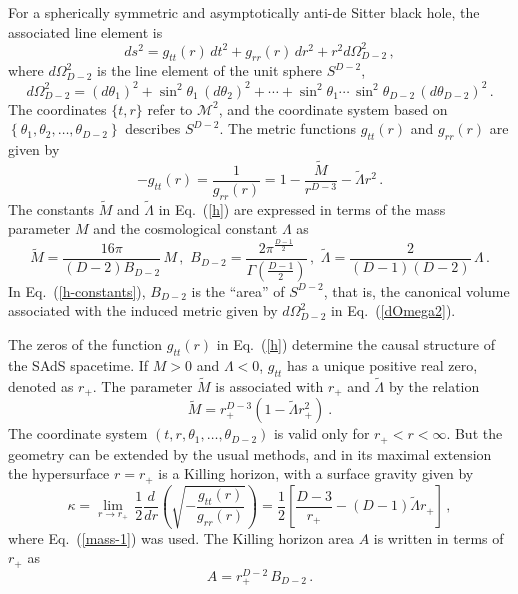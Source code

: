 \documentclass[prd,onecolumn,notitlepage,amsmath,nofootinbib,superscriptaddress,showpacs,showkeys]{revtex4-1}
\begin{document}
For a spherically symmetric and asymptotically anti-de Sitter black
hole, the associated line element is 
\begin{equation}
ds^{2}=g_{tt}(r)\, dt^{2}+g_{rr}(r)\, dr^{2}+r^{2}d\Omega_{D-2}^{2}\,,\label{metric}
\end{equation}
where $d\Omega_{D-2}^{2}$ is the line element of the unit sphere
$S^{D-2}$, 
\begin{equation}
d\Omega_{D-2}^{2}=\left(d\theta_{1}\right)^{2}+\sin^{2}\theta_{1}\,\left(d\theta_{2}\right)^{2}+\cdots+\sin^{2}\theta_{1}\cdots\,\sin^{2}\theta_{D-2}\,\left(d\theta_{D-2}\right)^{2}\,.\label{dOmega2}
\end{equation}
The coordinates $\{t,r\}$ refer to $\mathcal{M}^{2}$, and the coordinate
system based on \linebreak{}
 $\left\{ \theta_{1},\theta_{2},\ldots,\theta_{D-2}\right\} $ describes
$S^{D-2}$. The metric functions $g_{tt}(r)$ and $g_{rr}(r)$ are
given by 
\begin{equation}
-g_{tt}\left(r\right)=\frac{1}{g_{rr}(r)}=1-\frac{\tilde{M}}{r^{D-3}}-\tilde{\Lambda}r^{2}\,.\label{h}
\end{equation}
The constants $\tilde{M}$ and $\tilde{\Lambda}$ in Eq.~(\ref{h})
are expressed in terms of the mass parameter $M$ and the cosmological
constant $\Lambda$ as 
\begin{equation}
\tilde{M}=\frac{16\pi}{\left(D-2\right)B_{D-2}}\, M\,,\,\, B_{D-2}=\frac{2\pi^{\frac{D-1}{2}}}{\Gamma\left(\frac{D-1}{2}\right)}\,,\,\,\tilde{\Lambda}=\frac{2}{\left(D-1\right)\left(D-2\right)}\,\Lambda\,.\label{h-constants}
\end{equation}
In Eq.~(\ref{h-constants}), $B_{D-2}$ is the ``area'' of $S^{D-2}$,
that is, the canonical volume associated with the induced metric given
by $d\Omega_{D-2}^{2}$ in Eq.~(\ref{dOmega2}).

The zeros of the function $g_{tt}(r)$ in Eq.~(\ref{h}) determine
the causal structure of the SAdS spacetime. If $M>0$ and $\Lambda<0$,
$g_{tt}$ has a unique positive real zero, denoted as $r_{+}$. The
parameter $\tilde{M}$ is associated with $r_{+}$ and $\tilde{\Lambda}$
by the relation 
\begin{equation}
\tilde{M}=r_{+}^{D-3}\left(1-\tilde{\Lambda}r_{+}^{2}\right)\ .\label{mass-1}
\end{equation}
The coordinate system $\left(t,r,\theta_{1},\ldots,\theta_{D-2}\right)$
is valid only for $r_{+}<r<\infty$. But the geometry can be extended
by the usual methods, and in its maximal extension the hypersurface
$r=r_{+}$ is a Killing horizon, with a surface gravity given by 
\begin{equation}
\kappa=\lim_{r\rightarrow r_{+}}\,\frac{1}{2}\frac{d}{dr}\left(\sqrt{-\frac{g_{tt}(r)}{g_{rr}(r)}}\right)=\frac{1}{2}\left[\frac{D-3}{r_{+}}-\left(D-1\right)\tilde{\Lambda}r_{+}\right] \,,
\label{kappa-1}
\end{equation}
where Eq.~(\ref{mass-1}) was used. The Killing horizon area $A$
is written in terms of $r_{+}$ as 
\begin{equation}
A=r_{+}^{D-2}\, B_{D-2}\,.\label{area}
\end{equation}
\end{document}
